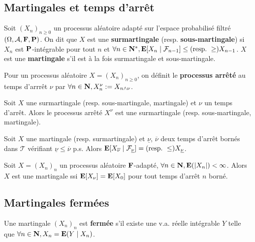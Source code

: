 \subsection{Martingales et temps d'arrêt}

	\begin{defn}
		Soit $(X_n)_{n \geq 0}$ un processus aléatoire adapté sur l'espace probabilisé filtré $(\Omega, \mathcal{A}, \mathbf{F}, \mathbf{P})$.
		On dit que $X$ est une \textbf{surmartingale} (resp. \textbf{sous-martingale}) si $X_n$ est $\mathbf{P}$-intégrable pour tout $n$ et $\forall n \in \mathbf{N}^*, \mathbf{E}[X_n \mid \mathcal{F}_{n - 1}] \leq (\text{resp.}\ \geq) X_{n - 1}$.
		$X$ est une \textbf{martingale} s'il est à la fois surmartingale et sous-martingale.
	\end{defn}

	\begin{defn}
		Pour un processus aléatoire $X = (X_n)_{n \geq 0}$, on définit le \textbf{processus arrêté} au temps d'arrrêt $\nu$ par $\forall n \in \mathbf{N}, X^\nu_n := X_{n \wedge \nu}$.
	\end{defn}
	
	\begin{lem}
		Soit $X$ une surmartingale (resp. sous-martingale, martingale) et $\nu$ un temps d'arrêt.
		Alors le processus arrêté $X^\nu$ est une surmartingale (resp. sous-martingale, martingale).
	\end{lem}

	\begin{thm}
		Soit $X$ une martingale (resp. surmartingale) et $\underline{\nu}$, $\overline{\nu}$ deux temps d'arrêt bornés dans $\mathcal{T}$ vérifiant $\underline{\nu} \leq \overline{\nu}$ p.s.
		Alors $\mathbf{E}[X_{\overline{\nu}} \mid \mathcal{F}_{\underline{\nu}}] = (\text{resp.}\ \leq) X_{\underline{\nu}}$.
	\end{thm}

	\begin{pop}
		Soit $X = (X_n)_n$ un processus aléatoire $\mathbf{F}$-adapté, $\forall n \in \mathbf{N}, \mathbf{E}(\left\lvert X_n\right\rvert) < \infty$.
		Alors $X$ est une martingale ssi $\mathbf{E}[X_\nu] = \mathbf{E}[X_0]$ pour tout temps d'arrêt $n$ borné.
	\end{pop}


\subsection{Martingales fermées}

	\begin{defn}
		Une martingale $(X_n)_n$ est \textbf{fermée} s'il existe une v.a. réelle intégrable $Y$ telle que $\forall n \in \mathbf{N}, X_n = \mathbf{E}(Y \mid X_n)$.
	\end{defn}
	
